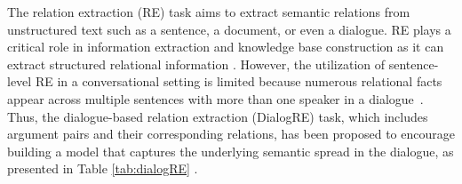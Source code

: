\documentclass[11pt]{article}
\begin{document}
The relation extraction (RE) task aims to extract semantic relations from unstructured text such as a sentence, a document, or even a dialogue. RE plays a critical role in information extraction and knowledge base construction  as it can extract structured relational information \citep{ji2010overview,swampillai2010inter}. However, the utilization of sentence-level RE in a conversational setting is limited because numerous relational facts appear across multiple sentences with more than one speaker in a dialogue~\citep{yao2021codred}. Thus, the dialogue-based relation extraction (DialogRE) task, which includes argument pairs and their corresponding relations, has been proposed to encourage building a model that captures the underlying semantic spread in the dialogue, as presented in Table \ref{tab:dialogRE} \citep{yu-etal-2020-dialogue}. 
\begin{table}[t]
\centering
{}
\end{table}
\end{document}

